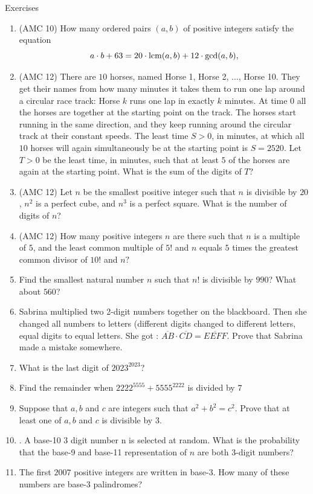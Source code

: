 \begin{xcb}{Exercises}
\begin{enumerate}
\item (AMC 10) How many ordered pairs $(a, b)$ of positive integers satisfy the equation\[a\cdot b + 63 = 20\cdot \operatorname*{lcm}(a, b) + 12\cdot\gcd(a,b),\]
\item (AMC 12) There are $10$ horses, named Horse 1, Horse 2, $\ldots$, Horse 10. They get their names from how many minutes it takes them to run one lap around a circular race track: Horse $k$ runs one lap in exactly $k$ minutes. At time 0 all the horses are together at the starting point on the track. The horses start running in the same direction, and they keep running around the circular track at their constant speeds. The least time $S > 0$, in minutes, at which all $10$ horses will again simultaneously be at the starting point is $S = 2520$. Let $T>0$ be the least time, in minutes, such that at least $5$ of the horses are again at the starting point. What is the sum of the digits of $T$?
\item (AMC 12) Let $n$ be the smallest positive integer such that $n$ is divisible by $20$, $n^2$ is a perfect cube, and $n^3$ is a perfect square. What is the number of digits of $n$?
\item (AMC 12) How many positive integers $n$ are there such that $n$ is a multiple of $5$, and the least common multiple of $5!$ and $n$ equals $5$ times the greatest common divisor of $10!$ and $n?$
\item Find the smallest natural number $n$ such that $n!$ is divisible by $990$? What about $560$?
\item Sabrina multiplied two 2-digit numbers together on the blackboard. Then she changed all numbers to letters (different digits changed to different letters, equal digits to equal letters. She got : $\overline{AB} \cdot \overline{CD} = \overline{EEFF}$. Prove that Sabrina made a mistake somewhere.
\item What is the last digit of $2023^{2023}$?
\item Find the remainder when $2222^{5555}+5555^{2222}$ is divided by $7$
\item  Suppose that $a, b$ and $c$ are integers such that $a^2 + b^2 = c^2$. Prove that at least one of $a, b$ and $c$ is divisible
by $3$.
\item . A base-10 3 digit number n is selected at random. What is the probability that the base-9 and base-11 representation of $n$ are both 3-digit numbers?
\item The first $2007$ positive integers are written in base-$3$. How many of these numbers are base-3 palindromes?

\end{enumerate}
\end{xcb}
